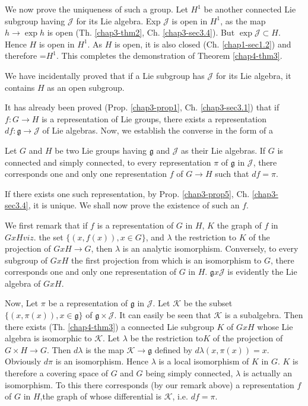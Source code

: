 We now prove the uniqueness of such a group. Let $H^1$ be another
connected Lie subgroup having $\mathscr{J}$ for its Lie algebra. Exp
$\mathscr{J}$ is open in $H^1$, as\pageoriginale 
the map $h \rightarrow \exp  h$ is
open (Th. \ref{chap3-thm2}, Ch. \ref{chap3-sec3.4}). But $\exp
\mathscr{J}\subset  H$.   
Hence $H$ is open in $H^{1}$. As $H$ is open, it is also closed
(Ch. \ref{chap1-sec1.2}) and therefore =$H^{1}$. This completes the demonstration of
Theorem \ref{chap4-thm3}. 

\begin{remark*}%
We have  incidentally proved that if a Lie subgroup has $\mathscr{J}$
for its  Lie algebra, it contains $H$ as an open subgroup. 
\end{remark*}

It has already been proved (Prop. \ref{chap3-prop1},
Ch. \ref{chap3-sec3.1}) that if $f : G 
\rightarrow H$ is a representation of Lie groups, there exists a
representation $df:  
\mathfrak{g} \rightarrow \mathscr{J}$ of Lie algebras. Now, we
establish the converse in the form of a   

\begin{coro*}%
 Let $G$ and $H$ be two Lie groups having $\mathfrak{g}$ and
 $\mathscr{J}$ as their Lie algebras. If $G$ is  connected and simply
 connected, to every representation $\pi$ of $\mathfrak{g}$ in
 $\mathscr{J}$, there corresponds one and only one representation $f$
 of $G \rightarrow H$ such that $df = \pi$. 
\end{coro*}

If there exists one such representation, by Prop. \ref{chap3-prop5},
Ch. \ref{chap3-sec3.4}, it 
is unique. We shall now prove the existence of such an $f$. 

We first remark that if $f$ is a representation of $G$ in $H$, $K$ the
graph of $f$ in $G x H viz$. the set $\{(x,f(x)),x \in G\}$, and
$\lambda$ the restriction to $K$ of the projection of $G x H
\rightarrow G$, then $\lambda$ is an analytic isomorphism.  
Conversely, to every subgroup of $G x H$ the first projection
from which is an isomorphism to $G$, there corresponds one and only
one representation of $G$ in $H$. $\mathfrak{g} x \mathscr{J}$ is
evidently the Lie algebra of $G x H$. 

Now, Let $\pi$ be a representation of $\mathfrak{g}$ in
$\mathscr{J}$. Let $\mathcal{K}$ be the subset $\{(x,\pi (x)), x \in
\mathfrak{g}\}$ of $\mathfrak{g}\times \mathscr{J}$. It can easily be
seen that $\mathcal{K}$ is a subalgebra. Then there exists (Th. \ref{chap4-thm3}) a
connected Lie subgroup $K$ of $G x H$ whose Lie algebra is
isomorphic to $\mathcal{K}$. Let $\lambda$ be the  restriction
to\pageoriginale $K$
of the projection of $G \times H \rightarrow G$. Then $d \lambda$ is
the map $\mathcal{K}\rightarrow \mathfrak{g}$  defined by $d \lambda
(x, \pi (x))= x$. Obviously $d \pi $ is an isomorphism. Hence
$\lambda$ is a local isomorphism of $K$ in $G$. $K$ is therefore  a
covering space of $G$ and $G$ being simply connected, $\lambda$ is
actually an isomorphism. To this there corresponds (by our remark
above)  a representation $f$ of $G$ in $H$,the graph of whose
differential is $\mathcal{K}$, i.e. $df = \pi$. 

